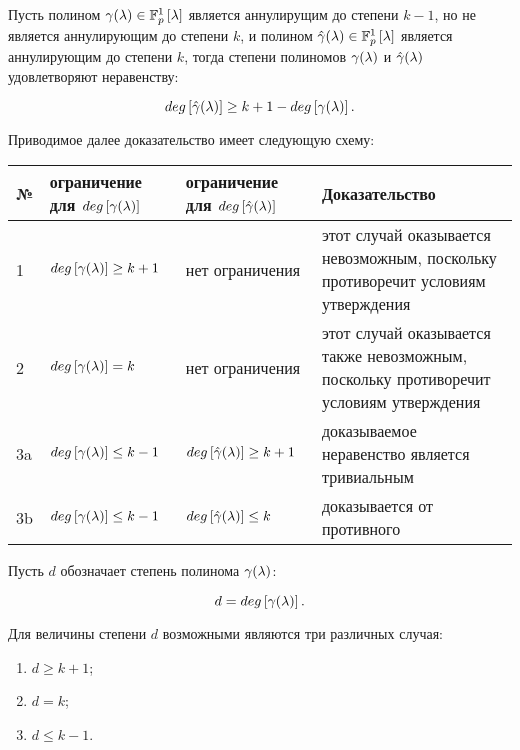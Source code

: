 \begin{statement} \label{statement:MDAP:annihilating_polynomial_degrees_inequality}

	Пусть полином $\gamma (\lambda) \in \mathbb{F}_p^1 \left [ \lambda \right ]$ является аннулирущим до степени $k-1$, но не
	является аннулирующим до степени $k$, и полином $\hat\gamma (\lambda) \in \mathbb{F}_p^1 \left [ \lambda \right ]$ является аннулирующим до степени $k$,
	тогда степени полиномов $\gamma (\lambda)$ и $\hat\gamma (\lambda)$ удовлетворяют неравенству:

		$$ deg \left [ \hat\gamma (\lambda) \right ] \ge k + 1 - deg \left [ \gamma (\lambda) \right ]. $$

	\proof

	Приводимое далее доказательство имеет следующую схему:

	\begin{tabular}{|p{1cm}|p{4cm}|p{4cm}|p{5cm}|}
	\hline
	№  & ограничение для $deg \left [ \gamma (\lambda) \right ]$ & ограничение для $deg \left [ \hat\gamma (\lambda) \right ]$ & Доказательство \\
	\hline
	\hline
	1  & $deg \left [ \gamma (\lambda) \right ] \ge k+1$         & нет ограничения                                 & этот случай оказывается невозможным, поскольку противоречит условиям утверждения \\
	\hline
	2  & $deg \left [ \gamma (\lambda) \right ] = k$             & нет ограничения                                 & этот случай оказывается также невозможным, поскольку противоречит условиям утверждения \\
	\hline
	3a & $deg \left [ \gamma (\lambda) \right ] \le k-1$         & $deg \left [ \hat\gamma (\lambda) \right ] \ge k+1$         & доказываемое неравенство является тривиальным \\
	\hline
	3b & $deg \left [ \gamma (\lambda) \right ] \le k-1$         & $deg \left [ \hat\gamma (\lambda) \right ] \le k$           & доказывается от противного \\
	\hline
	\end{tabular}

	Пусть $d$ обозначает степень полинома $\gamma (\lambda)$:

		$$ d = deg \left [ \gamma (\lambda) \right ]. $$

	Для величины степени $d$ возможными являются три различных случая:

	\begin{enumerate}
		\item $d \ge k+1$;
		\item $d = k$;
		\item $d \le k-1$.
	\end{enumerate}


\end{statement}
